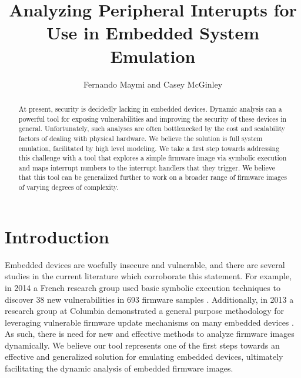 \documentclass[letterpaper, 10 pt, conference]{ieeeconf}
\title{\LARGE \bf
Analyzing Peripheral Interupts for Use in Embedded System Emulation
}
\author{Fernando Maymi and Casey McGinley}
\begin{document}
\maketitle
\thispagestyle{empty}
\pagestyle{empty}

\begin{abstract}
At present, security is decidedly lacking in embedded devices. Dynamic analysis can a powerful tool for exposing vulnerabilities and improving the security of these devices in general. Unfortunately, such analyses are often bottlenecked by the cost and scalability factors of dealing with physical hardware. We believe the solution is full system emulation, facilitated by high level modeling. We take a first step towards addressing this challenge with a tool that explores a simple firmware image via symbolic execution and maps interrupt numbers to the interrupt handlers that they trigger. We believe that this tool can be generalized further to work on a broader range of firmware images of varying degrees of complexity.
\end{abstract}

\section{Introduction}\label{intro}
Embedded devices are woefully insecure and vulnerable, and there are several studies in the current literature which corroborate this statement. For example, in 2014 a French research group used basic symbolic execution techniques to discover 38 new vulnerabilities in 693 firmware samples \cite{acostin}. Additionally, in 2013 a research group at Columbia demonstrated a general purpose methodology for leveraging vulnerable firmware update mechanisms on many embedded devices \cite{acui}. As such, there is need for new and effective methods to analyze firmware images dynamically. We believe our tool represents one of the first steps towards an effective and generalized solution for emulating embedded devices, ultimately facilitating the dynamic analysis of embedded firmware images.
\end{document}

